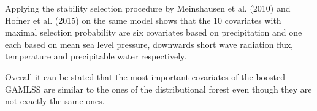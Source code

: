 \documentclass[american,foldmarks=false,noconfig]{uibklttr}
\begin{document}
Applying the stability selection procedure by Meinshausen et al. (2010) and
Hofner et al. (2015) on the same model shows that the 10 covariates with 
maximal selection probability are six covariates based on precipitation and 
one each based on mean sea level pressure, downwards short wave radiation 
flux, temperature and precipitable water respectively.





Overall it can be stated that the most important covariates of the boosted 
GAMLSS are similar to the ones of the distributional forest even though they
are not exactly the same ones.

\bigskip

\end{document}
